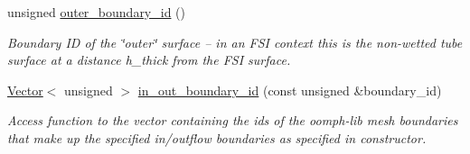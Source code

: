 \begin{DoxyCompactItemize}
unsigned \hyperlink{classoomph_1_1ThinLayerBrickOnTetMesh_aa753cb61dc2b1ed692dff8feeff67930}{outer\+\_\+boundary\+\_\+id} ()
\begin{DoxyCompactList}\small\item\em Boundary ID of the \char`\"{}outer\char`\"{} surface -- in an F\+SI context this is the non-\/wetted tube surface at a distance h\+\_\+thick from the F\+SI surface. \end{DoxyCompactList}\item 
\hyperlink{classoomph_1_1Vector}{Vector}$<$ unsigned $>$ \hyperlink{classoomph_1_1ThinLayerBrickOnTetMesh_a3cfd55eb5bbd6801e9d4cd271e602cd8}{in\+\_\+out\+\_\+boundary\+\_\+id} (const unsigned \&boundary\+\_\+id)
\begin{DoxyCompactList}\small\item\em Access function to the vector containing the ids of the oomph-\/lib mesh boundaries that make up the specified in/outflow boundaries as specified in constructor. \end{DoxyCompactList}\end{DoxyCompactItemize}
